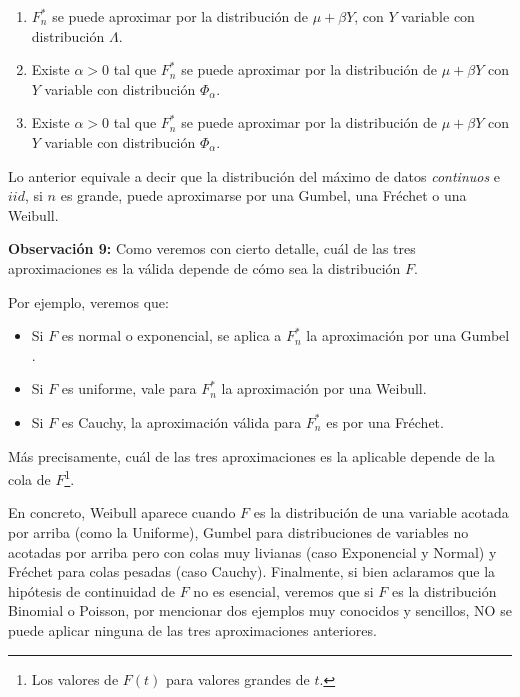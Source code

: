 \documentclass[
  20pt,
]{book}
\providecommand{\tightlist}{%
  \setlength{\itemsep}{0pt}\setlength{\parskip}{0pt}}
\theoremstyle{definition}
\theoremstyle{definition}
\theoremstyle{definition}
\theoremstyle{definition}
\theoremstyle{remark}
\begin{document}
\begin{enumerate}
\def\labelenumi{\alph{enumi})}
\tightlist
\item
  \(F^{\ast}_n\) se puede aproximar por la distribución
  de \(\mu+\beta Y\), con \(Y\) variable con distribución \(\Lambda\).
\item
  Existe \(\alpha>0\) tal que \(F_n^{\ast}\) se puede aproximar por la distribución de \(\mu+\beta Y\) con \(Y\) variable con distribución \(\Phi_{\alpha}\).
\item
  Existe \(\alpha>0\) tal que \(F_n^{\ast}\) se puede aproximar por la distribución de \(\mu+\beta Y\) con \(Y\) variable con distribución \(\Phi_{\alpha}\).
\end{enumerate}

Lo anterior equivale a decir que la distribución del máximo de datos \emph{continuos} e \(iid\), si \(n\) es grande, puede aproximarse por una Gumbel, una Fréchet o una Weibull.

\textbf{Observación 9:} Como veremos con cierto detalle, cuál de las tres aproximaciones es la válida depende de cómo sea la distribución \(F\).

Por ejemplo, veremos que:

\begin{itemize}
\tightlist
\item
  Si \(F\) es normal o exponencial, se aplica a \(F_n^{\ast}\) la aproximación por una Gumbel .
\item
  Si \(F\) es uniforme, vale para \(F_n^{\ast}\) la aproximación por una Weibull.
\item
  Si \(F\) es Cauchy, la aproximación válida para \(F_n^{\ast}\) es por una Fréchet.
\end{itemize}

Más precisamente, cuál de las tres aproximaciones es la aplicable depende de la cola de \(F\)\footnote{Los valores de \(F(t)\) para valores grandes de \(t\).}.

En concreto, Weibull aparece cuando \(F\) es la
distribución de una variable acotada por arriba
(como la Uniforme), Gumbel para distribuciones
de variables no acotadas por arriba pero con colas muy livianas (caso Exponencial y Normal) y Fréchet para colas pesadas (caso Cauchy).
Finalmente, si bien aclaramos que la hipótesis de continuidad de \(F\) no es esencial, veremos que si \(F\) es la distribución Binomial o Poisson, por mencionar
dos ejemplos muy conocidos y sencillos, NO se
puede aplicar ninguna de las tres aproximaciones
anteriores.
\end{document}
